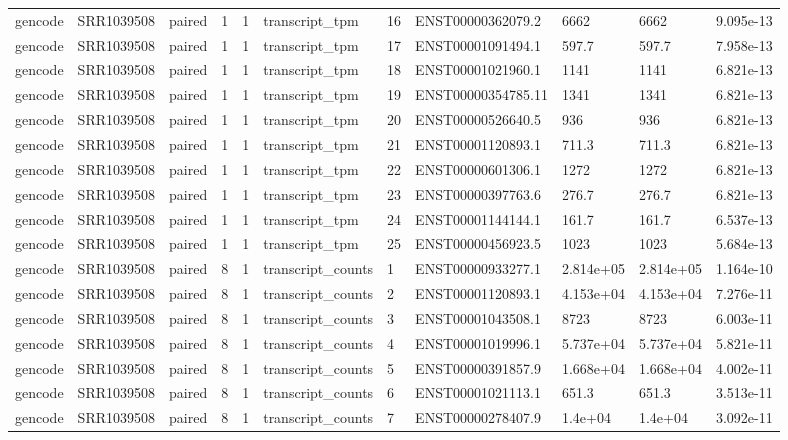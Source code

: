\begin{tabular}{lllllllllll}
gencode & SRR1039508 & paired & 1 & 1 & transcript\_tpm & 16 & ENST00000362079.2 & 6662 & 6662 & 9.095e-13 \\
gencode & SRR1039508 & paired & 1 & 1 & transcript\_tpm & 17 & ENST00001091494.1 & 597.7 & 597.7 & 7.958e-13 \\
gencode & SRR1039508 & paired & 1 & 1 & transcript\_tpm & 18 & ENST00001021960.1 & 1141 & 1141 & 6.821e-13 \\
gencode & SRR1039508 & paired & 1 & 1 & transcript\_tpm & 19 & ENST00000354785.11 & 1341 & 1341 & 6.821e-13 \\
gencode & SRR1039508 & paired & 1 & 1 & transcript\_tpm & 20 & ENST00000526640.5 & 936 & 936 & 6.821e-13 \\
gencode & SRR1039508 & paired & 1 & 1 & transcript\_tpm & 21 & ENST00001120893.1 & 711.3 & 711.3 & 6.821e-13 \\
gencode & SRR1039508 & paired & 1 & 1 & transcript\_tpm & 22 & ENST00000601306.1 & 1272 & 1272 & 6.821e-13 \\
gencode & SRR1039508 & paired & 1 & 1 & transcript\_tpm & 23 & ENST00000397763.6 & 276.7 & 276.7 & 6.821e-13 \\
gencode & SRR1039508 & paired & 1 & 1 & transcript\_tpm & 24 & ENST00001144144.1 & 161.7 & 161.7 & 6.537e-13 \\
gencode & SRR1039508 & paired & 1 & 1 & transcript\_tpm & 25 & ENST00000456923.5 & 1023 & 1023 & 5.684e-13 \\
gencode & SRR1039508 & paired & 8 & 1 & transcript\_counts & 1 & ENST00000933277.1 & 2.814e+05 & 2.814e+05 & 1.164e-10 \\
gencode & SRR1039508 & paired & 8 & 1 & transcript\_counts & 2 & ENST00001120893.1 & 4.153e+04 & 4.153e+04 & 7.276e-11 \\
gencode & SRR1039508 & paired & 8 & 1 & transcript\_counts & 3 & ENST00001043508.1 & 8723 & 8723 & 6.003e-11 \\
gencode & SRR1039508 & paired & 8 & 1 & transcript\_counts & 4 & ENST00001019996.1 & 5.737e+04 & 5.737e+04 & 5.821e-11 \\
gencode & SRR1039508 & paired & 8 & 1 & transcript\_counts & 5 & ENST00000391857.9 & 1.668e+04 & 1.668e+04 & 4.002e-11 \\
gencode & SRR1039508 & paired & 8 & 1 & transcript\_counts & 6 & ENST00001021113.1 & 651.3 & 651.3 & 3.513e-11 \\
gencode & SRR1039508 & paired & 8 & 1 & transcript\_counts & 7 & ENST00000278407.9 & 1.4e+04 & 1.4e+04 & 3.092e-11 \\

\end{tabular}
